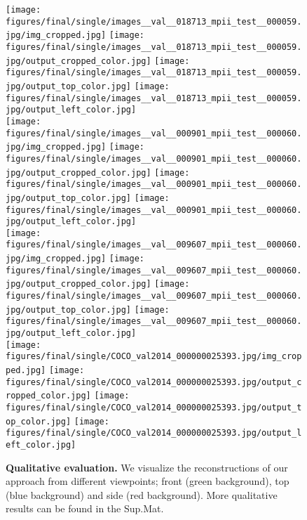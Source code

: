 \begin{figure*}[!t]
	\centering
    \texttt{[image: figures/final/single/images\_\_val\_\_018713\_mpii\_test\_\_000059.jpg/img\_cropped.jpg]}
    \texttt{[image: figures/final/single/images\_\_val\_\_018713\_mpii\_test\_\_000059.jpg/output\_cropped\_color.jpg]}
    \texttt{[image: figures/final/single/images\_\_val\_\_018713\_mpii\_test\_\_000059.jpg/output\_top\_color.jpg]}
    \texttt{[image: figures/final/single/images\_\_val\_\_018713\_mpii\_test\_\_000059.jpg/output\_left\_color.jpg]}\\
    \texttt{[image: figures/final/single/images\_\_val\_\_000901\_mpii\_test\_\_000060.jpg/img\_cropped.jpg]}
    \texttt{[image: figures/final/single/images\_\_val\_\_000901\_mpii\_test\_\_000060.jpg/output\_cropped\_color.jpg]}
    \texttt{[image: figures/final/single/images\_\_val\_\_000901\_mpii\_test\_\_000060.jpg/output\_top\_color.jpg]}
    \texttt{[image: figures/final/single/images\_\_val\_\_000901\_mpii\_test\_\_000060.jpg/output\_left\_color.jpg]}\\
    \texttt{[image: figures/final/single/images\_\_val\_\_009607\_mpii\_test\_\_000060.jpg/img\_cropped.jpg]}
    \texttt{[image: figures/final/single/images\_\_val\_\_009607\_mpii\_test\_\_000060.jpg/output\_cropped\_color.jpg]}
    \texttt{[image: figures/final/single/images\_\_val\_\_009607\_mpii\_test\_\_000060.jpg/output\_top\_color.jpg]}
    \texttt{[image: figures/final/single/images\_\_val\_\_009607\_mpii\_test\_\_000060.jpg/output\_left\_color.jpg]}\\
    \texttt{[image: figures/final/single/COCO\_val2014\_000000025393.jpg/img\_cropped.jpg]}
    \texttt{[image: figures/final/single/COCO\_val2014\_000000025393.jpg/output\_cropped\_color.jpg]}
    \texttt{[image: figures/final/single/COCO\_val2014\_000000025393.jpg/output\_top\_color.jpg]}
    \texttt{[image: figures/final/single/COCO\_val2014\_000000025393.jpg/output\_left\_color.jpg]}\\ 
	\vspace{-2mm}
	\caption{{\bf Qualitative evaluation.}
We visualize the reconstructions of our approach from different viewpoints; front (green background), top (blue background) and side (red background). More qualitative results can be found in the Sup.Mat.
}
\label{fig:qualitative}
\vspace{-2mm}
\end{figure*}
 
